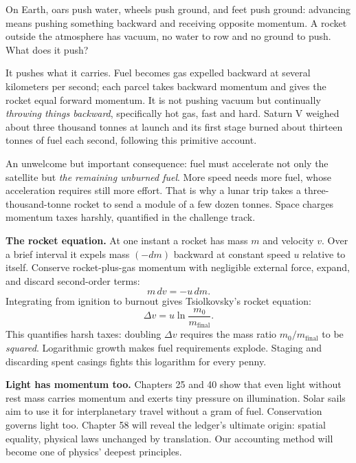 
\begin{thought}
On Earth, oars push water, wheels push ground, and feet push ground: advancing means pushing something backward and receiving opposite momentum. A rocket outside the atmosphere has vacuum, no water to row and no ground to push. What does it push?

It pushes what it carries. Fuel becomes gas expelled backward at several kilometers per second; each parcel takes backward momentum and gives the rocket equal forward momentum. It is not pushing vacuum but continually \emph{throwing things backward}, specifically hot gas, fast and hard. Saturn V weighed about three thousand tonnes at launch and its first stage burned about thirteen tonnes of fuel each second, following this primitive account.

An unwelcome but important consequence: fuel must accelerate not only the satellite but \emph{the remaining unburned fuel}. More speed needs more fuel, whose acceleration requires still more effort. That is why a lunar trip takes a three-thousand-tonne rocket to send a module of a few dozen tonnes. Space charges momentum taxes harshly, quantified in the challenge track.
\end{thought}

\begin{challenge}
\textbf{The rocket equation.} At one instant a rocket has mass \(m\) and velocity \(v\). Over a brief interval it expels mass \((-dm)\) backward at constant speed \(u\) relative to itself. Conserve rocket-plus-gas momentum with negligible external force, expand, and discard second-order terms:
\[
m\,dv=-u\,dm .
\]
Integrating from ignition to burnout gives Tsiolkovsky's rocket equation:
\[
\Delta v=u\ln\frac{m_0}{m_{\text{final}}} .
\]
This quantifies harsh taxes: doubling \(\Delta v\) requires the mass ratio \(m_0/m_{\text{final}}\) to be \emph{squared}. Logarithmic growth makes fuel requirements explode. Staging and discarding spent casings fights this logarithm for every penny.

\textbf{Light has momentum too.} Chapters 25 and 40 show that even light without rest mass carries momentum and exerts tiny pressure on illumination. Solar sails aim to use it for interplanetary travel without a gram of fuel. Conservation governs light too. Chapter 58 will reveal the ledger's ultimate origin: spatial equality, physical laws unchanged by translation. Our accounting method will become one of physics' deepest principles.
\end{challenge}

